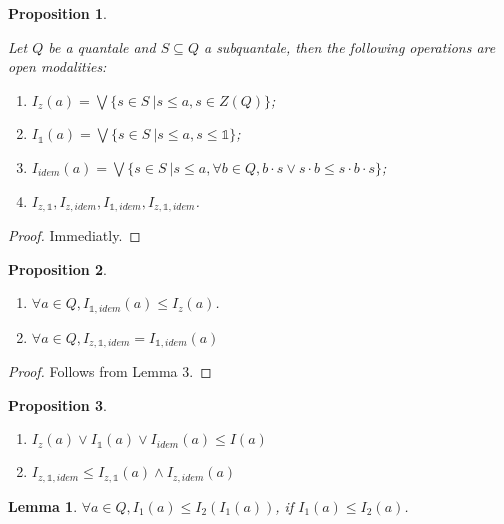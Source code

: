 \documentclass[a4paper]{article}
\newtheorem{prop}{Proposition}
\newtheorem{lemma}{Lemma}
\begin{document}
\begin{prop}
$ $

Let $Q$ be a quantale and $S \subseteq Q$ a subquantale, then the following operations are open modalities:

\begin{enumerate}
  \item $I_z (a) = \bigvee \{ s \in S \: | s \leq a, s \in Z(Q) \}$;
  \item $I_{\mathds{1}} (a) = \bigvee \{ s \in S \: | s \leq a, s \leq \mathds{1} \}$;
  \item $I_{idem} (a) = \bigvee \{ s \in S \: | s \leq a, \forall b \in Q, b \cdot s \vee s \cdot b \leq s \cdot b \cdot s\}$;
  \item $I_{z, \mathds{1}}, I_{z, idem}, I_{\mathds{1}, idem}, I_{z, \mathds{1}, idem}$.
\end{enumerate}
\end{prop}

\begin{proof}
  Immediatly.
\end{proof}

\begin{prop}
$ $

\begin{enumerate}
  \item $\forall a \in Q, I_{\mathds{1}, idem}(a) \leq I_z (a)$.
  \item $\forall a \in Q, I_{z, \mathds{1}, idem} = I_{\mathds{1}, idem}(a)$
\end{enumerate}

\end{prop}

\begin{proof}
  Follows from Lemma 3.
\end{proof}

\begin{prop}
$ $

\begin{enumerate}
  \item $I_z (a) \vee I_{\mathds{1}} (a) \vee I_{idem} (a) \leq I(a)$
  \item $I_{z, \mathds{1}, idem} \leq I_{z, \mathds{1}} (a) \wedge I_{z, idem} (a)$
\end{enumerate}
\end{prop}

\begin{lemma}
  $\forall a \in Q, I_1 (a) \leq I_2 (I_1 (a))$, if $I_1 (a) \leq I_2 (a)$.
\end{lemma}
\end{document}
